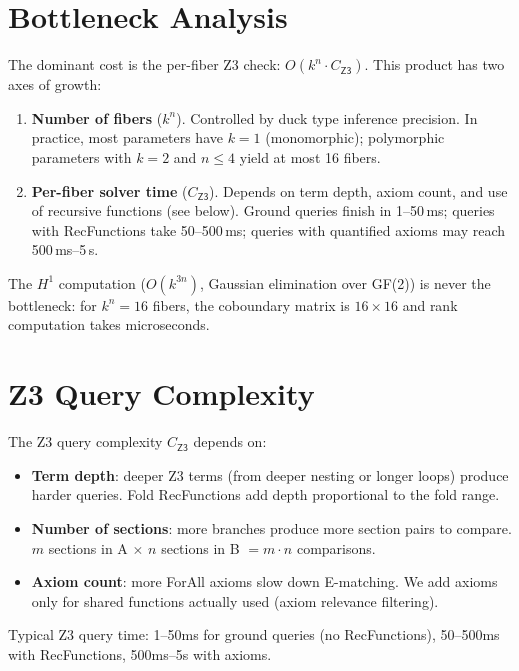 \documentclass[11pt,a4paper]{report}
\theoremstyle{definition}
\theoremstyle{plain}
\newcommand{\Hone}{H^1}
\begin{document}
\section{Bottleneck Analysis}

The dominant cost is the per-fiber Z3 check:
$O(k^n \cdot C_\mathsf{Z3})$.  This product has two axes of growth:

\begin{enumerate}
  \item \textbf{Number of fibers} ($k^n$).
    Controlled by duck type inference precision.  In practice,
    most parameters have $k = 1$ (monomorphic); polymorphic
    parameters with $k = 2$ and $n \leq 4$ yield at most 16
    fibers.

  \item \textbf{Per-fiber solver time} ($C_\mathsf{Z3}$).
    Depends on term depth, axiom count, and use of recursive
    functions (see below).  Ground queries finish in 1--50\,ms;
    queries with RecFunctions take 50--500\,ms; queries with
    quantified axioms may reach 500\,ms--5\,s.
\end{enumerate}

\noindent
The $\Hone$ computation ($O(k^{3n})$, Gaussian elimination over
GF(2)) is never the bottleneck: for $k^n = 16$ fibers, the
coboundary matrix is $16 \times 16$ and rank computation takes
microseconds.

\section{Z3 Query Complexity}

The Z3 query complexity $C_\mathsf{Z3}$ depends on:
\begin{itemize}
  \item \textbf{Term depth}: deeper Z3 terms (from deeper nesting or
    longer loops) produce harder queries.  Fold RecFunctions add
    depth proportional to the fold range.
  \item \textbf{Number of sections}: more branches produce more
    section pairs to compare.  $m$ sections in A $\times$ $n$
    sections in B $= m \cdot n$ comparisons.
  \item \textbf{Axiom count}: more ForAll axioms slow down E-matching.
    We add axioms only for shared functions actually used (axiom
    relevance filtering).
\end{itemize}

Typical Z3 query time: 1--50ms for ground queries (no RecFunctions),
50--500ms with RecFunctions, 500ms--5s with axioms.
\end{document}
